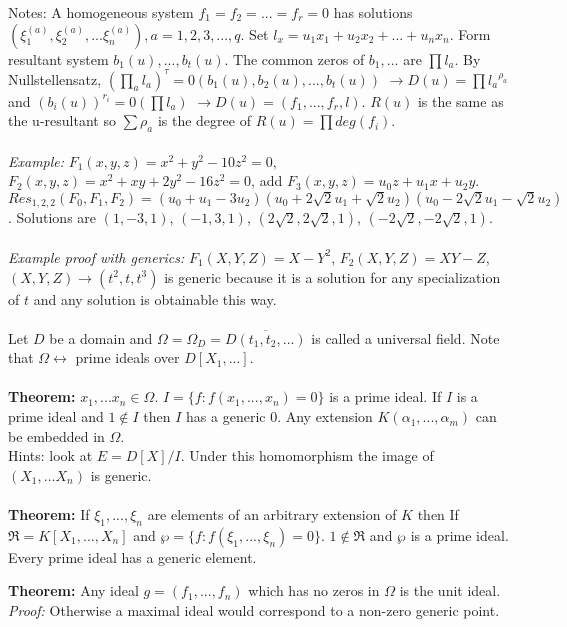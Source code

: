 Notes: A homogeneous system 
$f_1= f_2= ... =f_r= 0$ has solutions
$(\xi_1^{(a)}, \xi_2^{(a)},...  \xi_n^{(a)}), a= 1,2,3,...,q$.  
Set $l_x=u_1x_1+u_2x_2+...+u_nx_n$.
Form resultant system $b_1(u), ..., b_t(u)$.  The common zeros of $b_1, ...$ are
$\prod l_a$.  By Nullstellensatz, 
$(\prod_a l_a)^{\tau}=0 (b_1(u),b_2(u),...,b_t(u))$
$\rightarrow D(u)= \prod {l_a}^{\rho_a}$ and
$(b_i(u))^{r_i}=0 (\prod l_a)$
$\rightarrow D(u)= (f_1,...,f_r,l)$.  $R(u)$ is the same as the u-resultant so
$\sum \rho_a$ is the degree of $R(u)= \prod deg(f_i)$.
\\
\\
\emph{Example:} $F_1(x,y,z)=x^2+y^2-10z^2=0$,
$F_2(x,y,z)=x^2+xy+2y^2-16z^2=0$, add $F_3(x,y,z)= u_0z+u_1x+u_2y$.
$Res_{1,2,2}(F_0,F_1,F_2)=(u_0+u_1-3u_2)(u_0+2{\sqrt 2}u_1+{\sqrt 2}u_2)
(u_0-2{\sqrt 2}u_1-{\sqrt 2}u_2)$.  
Solutions are $(1,-3,1)$, $(-1,3,1)$, 
$(2{\sqrt 2}, 2{\sqrt 2}, 1)$,  
$(-2{\sqrt 2}, -2{\sqrt 2}, 1)$.
\\
\\
\emph{Example proof with generics:} $F_1(X,Y,Z)=X-Y^2$, $F_2(X,Y,Z)=XY-Z$,
$(X,Y,Z) \rightarrow (t^2,t,t^3)$ is generic because it is a solution for any
specialization of $t$ and any solution is obtainable this way.
\\
\\
Let $D$ be a domain and $\Omega=\Omega_D= {\overline {D(t_1,t_2,...)}}$ is called a universal
field.  Note that $\Omega \leftrightarrow$ {prime ideals over} $D[X_1,...]$.
\\
\\
{\bf Theorem:} $x_1, ... x_n \in \Omega$.  $I= \{ f: f(x_1,...,x_n)=0 \}$ is a prime ideal.
If $I$ is a prime ideal and $1 \notin I$ then $I$ has a generic 0.  Any extension
$K(\alpha_1 , ..., \alpha_m)$ can be embedded in $\Omega$.
\\
Hints: look at $E=D[X]/I$.  Under this homomorphism the image of $(X_1,...X_n)$ is generic.
\\
\\
{\bf Theorem:} If $\xi_1 ,..., \xi_n$ are elements of an arbitrary extension of $K$ then
If $\Re =K[X_1,...,X_n]$ and $\wp= \{ f: f(\xi_1,...,\xi_n)=0 \}$.  
$1 \notin \Re$ and $\wp$ is a prime ideal.  Every prime ideal has a generic element.
\begin{quote}
\end{quote}
{\bf Theorem:}  Any ideal $g=(f_1, ..., f_n)$ which has no zeros in $\Omega$ is the unit ideal.
\emph{Proof:} Otherwise a maximal ideal would correspond to a non-zero generic point.
\begin{quote}
\end{quote}
